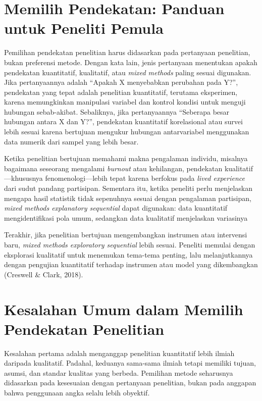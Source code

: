 \documentclass[
  indonesian,
  letterpaper,
  DIV=11,
  numbers=noendperiod]{scrreprt}
\begin{document}
\section{Memilih Pendekatan: Panduan untuk Peneliti
Pemula}\label{memilih-pendekatan-panduan-untuk-peneliti-pemula}

Pemilihan pendekatan penelitian harus didasarkan pada pertanyaan
penelitian, bukan preferensi metode. Dengan kata lain, jenis pertanyaan
menentukan apakah pendekatan kuantitatif, kualitatif, atau \emph{mixed
methods} paling sesuai digunakan. Jika pertanyaannya adalah ``Apakah X
menyebabkan perubahan pada Y?'', pendekatan yang tepat adalah penelitian
kuantitatif, terutama eksperimen, karena memungkinkan manipulasi
variabel dan kontrol kondisi untuk menguji hubungan sebab-akibat.
Sebaliknya, jika pertanyaannya ``Seberapa besar hubungan antara X dan
Y?'', pendekatan kuantitatif korelasional atau survei lebih sesuai
karena bertujuan mengukur hubungan antarvariabel menggunakan data
numerik dari sampel yang lebih besar.

Ketika penelitian bertujuan memahami makna pengalaman individu, misalnya
bagaimana seseorang mengalami \emph{burnout} atau kehilangan, pendekatan
kualitatif---khususnya fenomenologi---lebih tepat karena berfokus pada
\emph{lived experience} dari sudut pandang partisipan. Sementara itu,
ketika peneliti perlu menjelaskan mengapa hasil statistik tidak
sepenuhnya sesuai dengan pengalaman partisipan, \emph{mixed methods
explanatory sequential} dapat digunakan: data kuantitatif
mengidentifikasi pola umum, sedangkan data kualitatif menjelaskan
variasinya

Terakhir, jika penelitian bertujuan mengembangkan instrumen atau
intervensi baru, \emph{mixed methods exploratory sequential} lebih
sesuai. Peneliti memulai dengan eksplorasi kualitatif untuk menemukan
tema-tema penting, lalu melanjutkannya dengan pengujian kuantitatif
terhadap instrumen atau model yang dikembangkan (Creswell \& Clark,
2018).

\section{Kesalahan Umum dalam Memilih Pendekatan
Penelitian}\label{kesalahan-umum-dalam-memilih-pendekatan-penelitian}

Kesalahan pertama adalah menganggap penelitian kuantitatif lebih ilmiah
daripada kualitatif. Padahal, keduanya sama-sama ilmiah tetapi memiliki
tujuan, asumsi, dan standar kualitas yang berbeda. Pemilihan metode
seharusnya didasarkan pada kesesuaian dengan pertanyaan penelitian,
bukan pada anggapan bahwa penggunaan angka selalu lebih obyektif.
\end{document}
